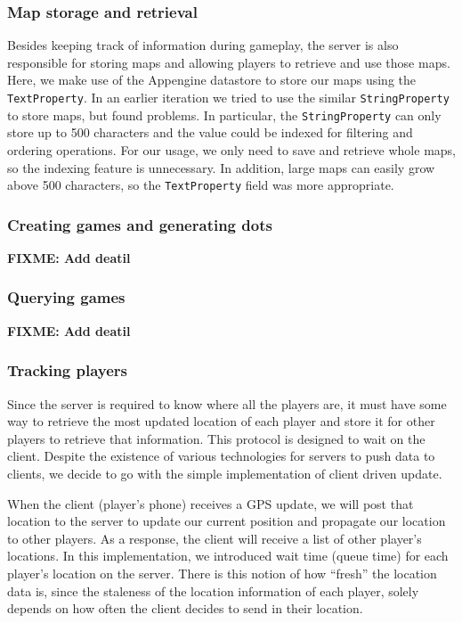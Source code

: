 \documentclass{acm_proc_article-sp}
\newcommand{\FIXME}[1]{{\color{red}\textbf{FIXME: #1}}}
\begin{document}
\subsubsection{Map storage and retrieval}
Besides keeping track of information during gameplay, the server
is also responsible for storing maps and allowing players to retrieve
and use those maps. Here, we make use of the Appengine
datastore to store our maps using the \texttt{TextProperty}.
In an earlier iteration we tried to use the similar \texttt{StringProperty}
to store maps, but found problems. In particular, the
\texttt{StringProperty} can only store up to
500 characters and the value could be indexed for filtering and
ordering operations. For our usage, we only need to save and retrieve whole
maps, so the indexing feature is unnecessary. In addition, large maps
can easily grow above 500 characters, so the \texttt{TextProperty} field
was more appropriate.


\subsubsection{Creating games and generating dots}
\FIXME{Add deatil}

\subsubsection{Querying games}
\FIXME{Add deatil}

\subsubsection{Tracking players}
Since the server is required to know where all the players are, it
must have some way to retrieve the most updated location of each
player and store it for other players to retrieve that
information. This protocol is designed to wait on the client. Despite
the existence of various technologies for servers to push data to
clients, we decide to go with the simple implementation of client
driven update.

When the client (player's phone) receives a GPS update, we will post
that location to the server to update our current position and
propagate our location to other players. As a response, the client
will receive a list of other player's locations. In this
implementation, we introduced wait time (queue time) for each
player's location on the server. There is this notion of how ``fresh''
the location data is, since the staleness of the location information
of each player, solely depends on how often the client decides to send
in their location.
\end{document}
